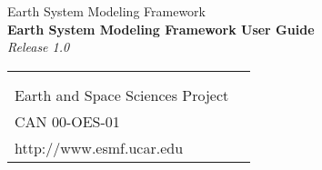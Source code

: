 \documentclass[]{article}
\begin{document}

\begin{titlepage}

\begin{center}
{\Large Earth System Modeling Framework } \\
\vspace{.25in}
{\Large {\bf Earth System Modeling Framework User Guide}} \\
\vspace{.25in}
{\large {\it Release 1.0}}
\vspace{.5in}
\end{center}

\begin{latexonly}
\vspace{5.5in}
\begin{tabular}{p{5in}p{.9in}}
\hrulefill \\
\noindent {\bf NASA High Performance Computing and Communications Program} \\
\noindent Earth and Space Sciences Project \\
\noindent CAN 00-OES-01 \\
\noindent http://www.esmf.ucar.edu \\
\end{tabular}
\end{latexonly}

\end{titlepage}

\tableofcontents

\newpage

\setlength{\parskip}{2ex}
\setlength{\parindent}{0ex}





\newpage









\end{document}
